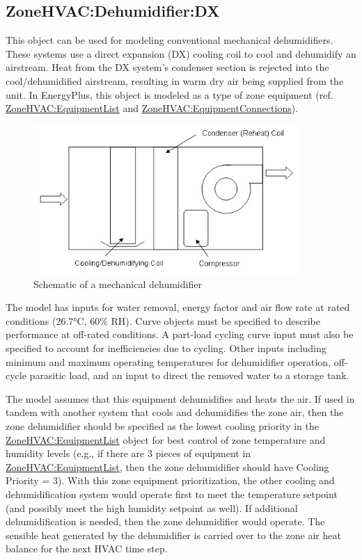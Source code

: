 \subsection{ZoneHVAC:Dehumidifier:DX}\label{zonehvacdehumidifierdx}

This object can be used for modeling conventional mechanical dehumidifiers. These systems use a direct expansion (DX) cooling coil to cool and dehumidify an airstream. Heat from the DX system's condenser section is rejected into the cool/dehumidified airstream, resulting in warm dry air being supplied from the unit. In EnergyPlus, this object is modeled as a type of zone equipment (ref. \hyperref[zonehvacequipmentlist]{ZoneHVAC:EquipmentList} and \hyperref[zonehvacequipmentconnections]{ZoneHVAC:EquipmentConnections}).

\begin{figure}[hbtp] %
\centering
\includegraphics[width=0.9\textwidth, height=0.9\textheight, keepaspectratio=true]{media/image292.png}
\caption{Schematic of a mechanical dehumidifier \protect \label{fig:schematic-of-a-mechanical-dehumidifier}}
\end{figure}

The model has inputs for water removal, energy factor and air flow rate at rated conditions (26.7°\si{C}, 60\% RH). Curve objects must be specified to describe performance at off-rated conditions. A part-load cycling curve input must also be specified to account for inefficiencies due to cycling. Other inputs including minimum and maximum operating temperatures for dehumidifier operation, off-cycle parasitic load, and an input to direct the removed water to a storage tank.

The model assumes that this equipment dehumidifies and heats the air. If used in tandem with another system that cools and dehumidifies the zone air, then the zone dehumidifier should be specified as the lowest cooling priority in the \hyperref[zonehvacequipmentlist]{ZoneHVAC:EquipmentList} object for best control of zone temperature and humidity levels (e.g., if there are 3 pieces of equipment in \hyperref[zonehvacequipmentlist]{ZoneHVAC:EquipmentList}, then the zone dehumidifier should have Cooling Priority = 3). With this zone equipment prioritization, the other cooling and dehumidification system would operate first to meet the temperature setpoint (and possibly meet the high humidity setpoint as well). If additional dehumidification is needed, then the zone dehumidifier would operate. The sensible heat generated by the dehumidifier is carried over to the zone air heat balance for the next HVAC time step.

